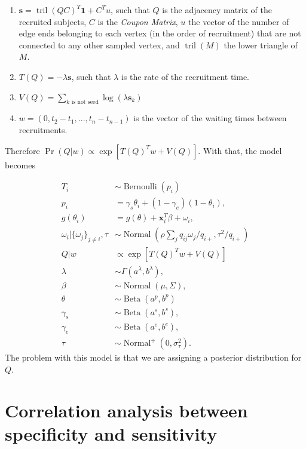 \documentclass[a4paper, notitlepage, 11pt]{article}
\newcommand{\x}{\boldsymbol{x}}
\newcommand{\N}{\operatorname{Normal}}
\newcommand{\betadist}{\operatorname{Beta}}
\newcommand{\tril}{\operatorname{tril}}
\theoremstyle{definition}
\theoremstyle{remark}
\begin{document}
\begin{enumerate}
  \item $\boldsymbol{s} = \tril(QC)^T \boldsymbol{1} + C^Tu$, such that $Q$ is the
  adjacency matrix of the recruited subjects, $C$ is the {\em Coupon Matrix},
  $u$ the vector of the number of edge ends belonging to each vertex
  (in the order of recruitment) that are not connected to any other sampled
  vertex, and $\tril(M)$ the lower triangle of $M$. 

  \item $T(Q) = -\lambda \boldsymbol{s}$, such that $\lambda$ is the rate of
  the recruitment time. 

  \item $V(Q) = \sum_{k \text{ is not seed}} \log(\lambda \boldsymbol{s}_k)$
  
  \item $w = (0, t_2 - t_1, ..., t_n - t_{n-1})$ is the vector of the waiting times between
  recruitments.  
\end{enumerate}

Therefore $\Pr(Q|w) \propto \exp[T(Q)^Tw + V(Q)]$. With that, the model
becomes 

\begin{equation}
  \begin{aligned}
    T_i &\sim \operatorname{Bernoulli}(p_i) \\
    p_i &= \gamma_s\theta_i + (1-\gamma_e)(1 - \theta_i),  \\
    g(\theta_i) &= g(\theta) + \x_i^T\beta + \omega_i,  \\
    \omega_i|\{\omega_j\}_{j\neq i}, \tau &\sim \N\left(\rho\sum_j q_{ij}\omega_j/q_{i+}, \tau^2/q_{i+}\right) \\
    Q|w &\propto \exp[T(Q)^Tw + V(Q)] \\
    \lambda &\sim \Gamma(a^{\lambda}, b^{\lambda}), \\ 
    \beta &\sim \N(\mu, \Sigma), \\ 
    \theta &\sim \betadist(a^p, b^p) \\
    \gamma_s &\sim \betadist(a^s, b^s), \\
    \gamma_e &\sim \betadist(a^e, b^e), \\  
    \tau &\sim \N^+(0,\sigma^2_{\tau}).
  \end{aligned}  
\end{equation}
The problem with this model is that we are assigning a posterior distribution
for $Q$.

\section{Correlation analysis between specificity and sensitivity}
\end{document}

